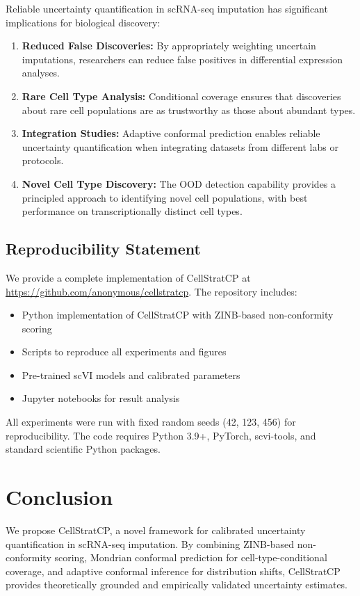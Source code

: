 \documentclass{article}
\begin{document}
Reliable uncertainty quantification in scRNA-seq imputation has significant implications for biological discovery:
\begin{enumerate}
    \item \textbf{Reduced False Discoveries:} By appropriately weighting uncertain imputations, researchers can reduce false positives in differential expression analyses.
    \item \textbf{Rare Cell Type Analysis:} Conditional coverage ensures that discoveries about rare cell populations are as trustworthy as those about abundant types.
    \item \textbf{Integration Studies:} Adaptive conformal prediction enables reliable uncertainty quantification when integrating datasets from different labs or protocols.
    \item \textbf{Novel Cell Type Discovery:} The OOD detection capability provides a principled approach to identifying novel cell populations, with best performance on transcriptionally distinct cell types.
\end{enumerate}

\subsection{Reproducibility Statement}

We provide a complete implementation of CellStratCP at \url{https://github.com/anonymous/cellstratcp}. The repository includes:
\begin{itemize}
    \item Python implementation of CellStratCP with ZINB-based non-conformity scoring
    \item Scripts to reproduce all experiments and figures
    \item Pre-trained scVI models and calibrated parameters
    \item Jupyter notebooks for result analysis
\end{itemize}
All experiments were run with fixed random seeds (42, 123, 456) for reproducibility. The code requires Python 3.9+, PyTorch, scvi-tools, and standard scientific Python packages.

\section{Conclusion}

We propose CellStratCP, a novel framework for calibrated uncertainty quantification in scRNA-seq imputation. By combining ZINB-based non-conformity scoring, Mondrian conformal prediction for cell-type-conditional coverage, and adaptive conformal inference for distribution shifts, CellStratCP provides theoretically grounded and empirically validated uncertainty estimates.
\end{document}
